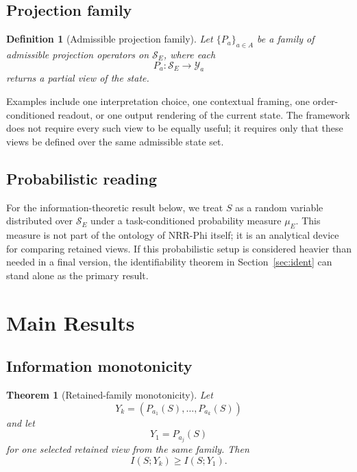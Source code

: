 \documentclass[11pt,a4paper]{article}
\newtheorem{definition}{Definition}
\newtheorem{theorem}{Theorem}
\begin{document}
\subsection{Projection family}

\begin{definition}[Admissible projection family]
Let $\{P_a\}_{a \in A}$ be a family of admissible projection operators on $\mathcal{S}_E$, where each
\begin{equation}
P_a : \mathcal{S}_E \to \mathcal{Y}_a
\end{equation}
returns a partial view of the state.
\end{definition}

Examples include one interpretation choice, one contextual framing, one order-conditioned readout, or one output rendering of the current state. The framework does not require every such view to be equally useful; it requires only that these views be defined over the same admissible state set.

\subsection{Probabilistic reading}

For the information-theoretic result below, we treat $S$ as a random variable distributed over $\mathcal{S}_E$ under a task-conditioned probability measure $\mu_E$. This measure is not part of the ontology of NRR-Phi itself; it is an analytical device for comparing retained views. If this probabilistic setup is considered heavier than needed in a final version, the identifiability theorem in Section~\ref{sec:ident} can stand alone as the primary result.

\section{Main Results}
\label{sec:results}

\subsection{Information monotonicity}

\begin{theorem}[Retained-family monotonicity]
\label{thm:monotonicity}
Let
\begin{equation}
Y_k = (P_{a_1}(S), \ldots, P_{a_k}(S))
\end{equation}
and let
\begin{equation}
Y_1 = P_{a_j}(S)
\end{equation}
for one selected retained view from the same family. Then
\begin{equation}
I(S;Y_k) \geq I(S;Y_1).
\end{equation}
\end{theorem}
\end{document}
